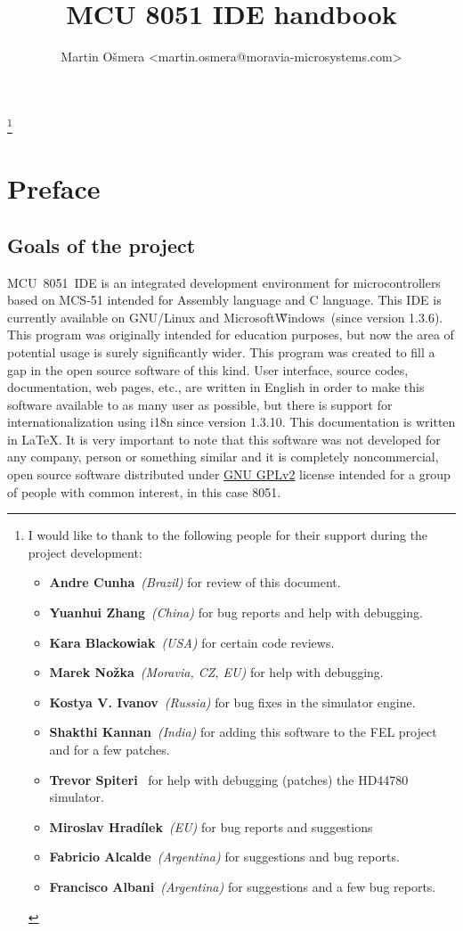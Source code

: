 \documentclass[a4paper,twoside,12pt]{book}
\title{MCU 8051 IDE handbook}
\author{Martin Ošmera <martin.osmera@moravia-microsystems.com>}
\begin{document}
\maketitle
\thanks{
	I would like to thank to the following people for their support during the project development:

	\begin{itemize}
		\item \textbf{Andre Cunha}~\textit{(Brazil)} for review of this document.
		\item \textbf{Yuanhui Zhang}~\textit{(China)} for bug reports and help with debugging.
		\item \textbf{Kara Blackowiak}~\textit{(USA)} for certain code reviews.
		\item \textbf{Marek Nožka}~\textit{(Moravia, CZ, EU)} for help with debugging.
		\item \textbf{Kostya V. Ivanov}~\textit{(Russia)} for bug fixes in the simulator engine.
		\item \textbf{Shakthi Kannan}~\textit{(India)} for adding this software to the FEL project and for a few patches.
		\item \textbf{Trevor Spiteri}~ for help with debugging (patches) the HD44780 simulator.
		\item \textbf{Miroslav Hradílek}~\textit{(EU)} for bug reports and suggestions
		\item \textbf{Fabricio Alcalde}~\textit{(Argentina)} for suggestions and bug reports.
		\item \textbf{Francisco Albani}~\textit{(Argentina)} for suggestions and a few bug reports.
	\end{itemize}
}

\tableofcontents
\newpage

\chapter*{Preface}
	\section*{Goals of the project}
		MCU~8051~IDE is an integrated development environment for microcontrollers based on MCS-51 intended for Assembly language and C language. This IDE is currently available on GNU/Linux and Microsoft\textregistered\~Windows\textregistered\ (since version 1.3.6). This program was originally intended for education purposes, but now the area of potential usage is surely significantly wider. This program was created to fill a gap in the open source software of this kind. User interface, source codes, documentation, web pages, etc., are written in English in order to make this software available to as many user as possible, but there is support for internationalization using i18n since version 1.3.10. This documentation is written in \LaTeX. It is very important to note that this software was not developed for any company, person or something similar and it is completely noncommercial, open source software distributed under \href{http://gnu.cz/article/30/pdf/gpl-cz.pdf}{GNU GPLv2} license intended for a group of
people with common interest, in this case 8051.
\end{document}

